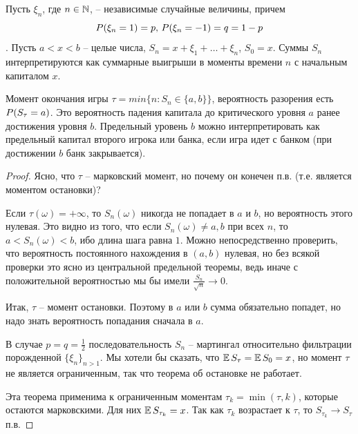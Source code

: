 Пусть $\xi_n$, где $n \in\N$, -- независимые случайные величины, причем
$$\P(\xi_n = 1) = p \text{, }\P(\xi_n = -1) = q = 1 - p$$.
Пусть $a < x < b$ -- целые числа, $S_n = x + \xi_1 + \ldots + \xi_n$, $S_0 = x$.
Суммы $S_n$ интерпретируются как суммарные выигрыши в моменты времени $n$ с начальным капиталом $x$.

Момент окончания игры $\tau = min\{n: S_n \in \{a, b\}\}$, вероятность
разорения есть $\P(S_{\tau} = a)$. Это вероятность падения капитала до критического уровня $a$ ранее достижения уровня $b$. 
Предельный уровень $b$
можно интерпретировать как предельный капитал второго игрока или
банка, если игра идет с банком (при достижении $b$ банк закрывается).

\begin{proof}
    Ясно, что $\tau$ -- марковский момент, но почему он конечен п.в. (т.е.
    является моментом остановки)? 
    
    Если $\tau(\omega) = +\infty$, то $S_n(\omega)$ никогда не попадает в $a$ и $b$, но вероятность этого нулевая. Это видно из того,
    что если $S_n(\omega) \neq a, b$ при всех $n$, то $a < S_n(\omega) < b$, ибо длина шага
    равна $1$. Можно непосредственно проверить, что вероятность постоянного нахождения в $(a, b)$ нулевая, но без всякой проверки это ясно
    из центральной предельной теоремы, ведь иначе с положительной вероятностью мы бы имели $\frac{S_n}{\sqrt{n}}\to 0$. 
    
    Итак, $\tau$ -- момент остановки.
    Поэтому в $a$ или $b$ сумма обязательно попадет, но надо знать вероятность попадания сначала в $a$.
    
    В случае $p = q = \frac{1}{2}$ последовательность $S_n$ -- мартингал относительно фильтрации порожденной 
    $\{\xi_n\}_{n>1}$. Мы хотели бы сказать,
    что $\E S_{\tau} = \E S_0 = x$, но момент $\tau$ не является ограниченным, так
    что теорема об остановке не работает. 
    
    Эта теорема применима к ограниченным моментам $\tau_k = \min (\tau, k)$, которые остаются марковскими. Для них $\E S_{\tau_k} = x$. Так как $\tau_k$ возрастает к $\tau$, то $S_{\tau_k} \to S_{\tau}$ п.в.
    

\end{proof}
